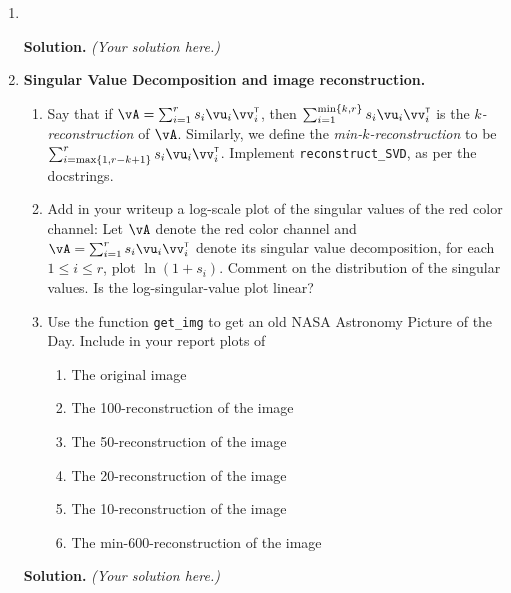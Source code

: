 \documentclass{article}
\newcommand\T{{\scriptscriptstyle\mathsf{T}}}
\theoremstyle{definition}
\theoremstyle{remark}
\newenvironment{Q}
        {%
            \clearpage
        \item
            }
        {%
            \phantom{s}
          \bigskip
          \textbf{Solution.}
        }
\begin{document}
\begin{enumerate}
\begin{Q}
\begin{enumerate}
                \end{enumerate}
            \end{Q}
                \emph{(Your solution here.)}


                \begin{Q}
                    \textbf{Singular Value Decomposition and image reconstruction.}
                    \begin{enumerate}
                        \item Say that if $\vA = \sum_{i=1}^r s_i \vu_i \vv_i^\T$,
                            then $\sum_{i=1}^{\min\{k,r\}} s_i \vu_i \vv_i^\T$ is
                            the \emph{$k$-reconstruction} of $\vA$.
                            Similarly, we define the
                            \emph{min-$k$-reconstruction} to be
                            $\sum_{i=\max\{1,r-k+1\}}^{r} s_i \vu_i \vv_i^\T$.
                            Implement \texttt{reconstruct\_SVD}, as per the
                            docstrings.
                        \item Add in your writeup a log-scale plot of the singular values
                            of the red color channel:
                            Let $\vA$ denote the red color channel and
                            $\vA = \sum_{i=1}^r s_i \vu_i \vv_i^\T$ denote its singular value decomposition,
                            for each $1\le i\le r$, plot $\ln(1+s_i)$.
                            Comment on the distribution of the singular values.
                            Is the log-singular-value plot linear?
                        \item Use the function \texttt{get\_img} to get an old
                            NASA Astronomy Picture of the Day.  Include in your report plots of
                            \begin{enumerate}
                                \item The original image
                                \item The 100-reconstruction of the image
                                \item The 50-reconstruction of the image
                                \item The 20-reconstruction of the image
                                \item The 10-reconstruction of the image
                                \item The min-600-reconstruction of the image
                            \end{enumerate}
                    \end{enumerate}
                \end{Q}
          \emph{(Your solution here.)}


\end{enumerate}
\end{document}
